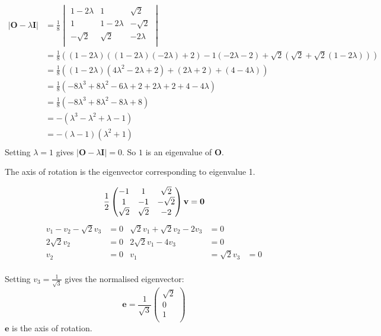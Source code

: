 \documentclass[10pt,oneside,a4paper]{article}
\begin{document}
\begin{enumerate}
\[
\begin{split}
|\mathbf{O} - \lambda\mathbf{I}| &=
\frac{1}{8}
\begin{vmatrix}
1 - 2\lambda & 1 & \sqrt {2} \\
1 & 1 - 2\lambda & -\sqrt {2} \\
-\sqrt {2} & \sqrt {2} & -2\lambda \\
\end{vmatrix} \\
&= \frac{1}{8}\left((1 - 2\lambda)((1 - 2\lambda)(-2\lambda) + 2) - 1(-2\lambda - 2) + \sqrt {2}\left(\sqrt {2} + \sqrt
{2}(1 - 2\lambda)\right)\right) \\
&= \frac{1}{8} ((1 - 2\lambda)(4\lambda^2 - 2\lambda + 2) + (2\lambda + 2) + (4 - 4\lambda)) \\
&= \frac{1}{8}(-8\lambda^3 + 8\lambda^2 - 6\lambda + 2 + 2\lambda + 2 + 4 - 4\lambda) \\
&= \frac{1}{8}(-8\lambda^3 + 8\lambda^2 - 8\lambda + 8) \\
&= -(\lambda^3 - \lambda^2 + \lambda - 1) \\
&= -(\lambda - 1)(\lambda^2 + 1) \\
\end{split}
\]
Setting $\lambda = 1$ gives $|\mathbf{O} - \lambda\mathbf{I}| = 0$. So $1$ is an eigenvalue of $\mathbf{O}$.

The axis of rotation is the eigenvector corresponding to eigenvalue 1.

\[
\frac{1}{2}
\begin{pmatrix}
-1 & 1 & \sqrt {2} \\
1 & -1 & -\sqrt {2} \\
\sqrt {2} & \sqrt {2} & -2 \\
\end{pmatrix}
\mathbf{v} = \mathbf{0} \\
\]
\begin{align*}
v_1 - v_2 - \sqrt {2}v_3 &= 0 & \sqrt {2}v_1 + \sqrt {2}v_2 - 2v_3 &= 0 \\
2\sqrt {2}v_2 &= 0 & 2\sqrt {2}v_1 - 4v_3 &= 0 \\
v_2 &= 0 & v_1 &= \sqrt {2} v_3 &= 0 \\
\end{align*}

Setting $v_3 = \frac{1}{\sqrt {3}}$ gives the normalised eigenvector:
\[
\mathbf{e} =
\frac{1}{\sqrt {3}}
\begin{pmatrix}
\sqrt {2} \\ 0 \\ 1 \\
\end{pmatrix}
\]
$\mathbf{e}$ is the axis of rotation.


\end{enumerate}
\end{document}
